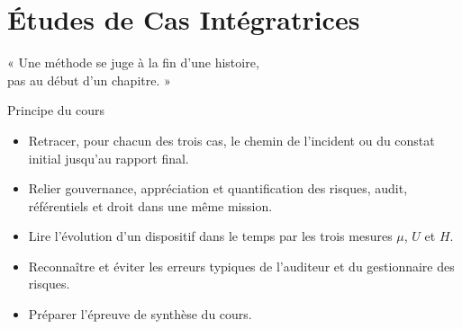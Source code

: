 
\chapter{Études de Cas Intégratrices}
\label{chap:cas-integrateurs}

\epigraph{%
    « Une méthode se juge à la fin d'une histoire,\\
    pas au début d'un chapitre. »%
}{Principe du cours}


\begin{boxobjectifs}
\begin{itemize}
    \item Retracer, pour chacun des trois cas, le chemin de l'incident ou du
          constat initial jusqu'au rapport final.
    \item Relier gouvernance, appréciation et quantification des risques,
          audit, référentiels et droit dans une même mission.
    \item Lire l'évolution d'un dispositif dans le temps par les trois
          mesures $\mu$, $U$ et $H$.
    \item Reconnaître et éviter les erreurs typiques de l'auditeur et du
          gestionnaire des risques.
    \item Préparer l'épreuve de synthèse du cours.
\end{itemize}
\end{boxobjectifs}

